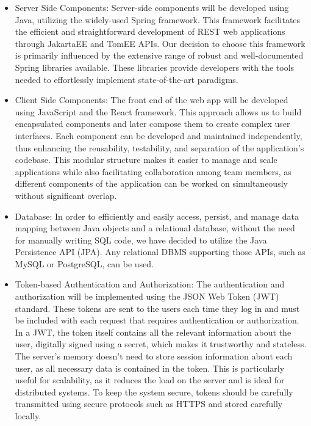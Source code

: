 \documentclass{Configuration_Files/Template}
\begin{document}
\begin{itemize}
    \item \textcolor{bluepoli}{Server Side Components}: Server-side components will be developed using Java, utilizing the widely-used Spring framework. This framework facilitates the efficient and straightforward development of REST web applications through JakartaEE and TomEE APIs. Our decision to choose this framework is primarily influenced by the extensive range of robust and well-documented Spring libraries available. These libraries provide developers with the tools needed to effortlessly implement state-of-the-art paradigms.
    \item \textcolor{bluepoli}{Client Side Components}: The front end of the web app will be developed using JavaScript and the React framework. This approach allows us to build encapsulated components and later compose them to create complex user interfaces. Each component can be developed and maintained independently, thus enhancing the reusability, testability, and separation of the application's codebase. This modular structure makes it easier to manage and scale applications while also facilitating collaboration among team members, as different components of the application can be worked on simultaneously without significant overlap.
    \item \textcolor{bluepoli}{Database}: In order to efficiently and easily access, persist, and manage data mapping between Java objects and a relational database, without the need for manually writing SQL code, we have decided to utilize the Java Persistence API (JPA). Any relational DBMS supporting those APIs, such as MySQL or PostgreSQL, can be used.
    \item \textcolor{bluepoli}{Token-based Authentication and Authorization}: The authentication and authorization will be implemented using the JSON Web Token (JWT) standard. These tokens are sent to the users each time they log in and must be included with each request that requires authentication or authorization. In a JWT, the token itself contains all the relevant information about the user, digitally signed using a secret, which makes it trustworthy and stateless. The server's memory doesn't need to store session information about each user, as all necessary data is contained in the token. This is particularly useful for scalability, as it reduces the load on the server and is ideal for distributed systems. To keep the system secure, tokens should be carefully transmitted using secure protocols such as HTTPS and stored carefully locally.
\end{itemize}
\end{document}
